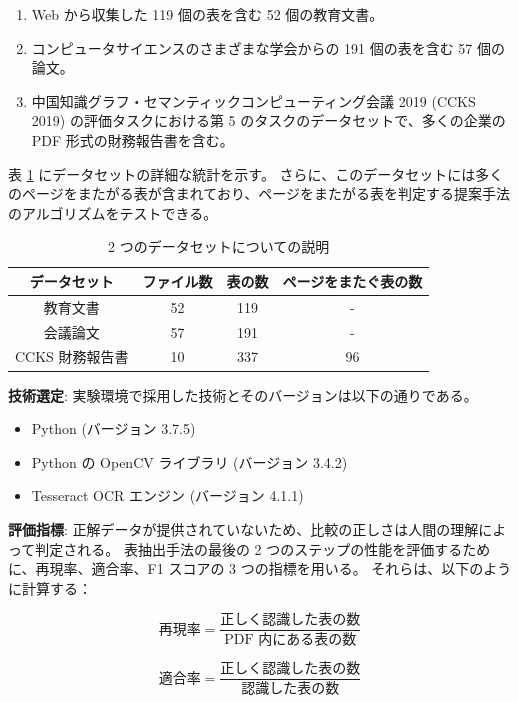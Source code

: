 \documentclass[uplatex, twocolumn,10pt]{jsarticle}
\begin{document}
\begin{enumerate}
    \item Web から収集した 119 個の表を含む 52 個の教育文書。
    \item コンピュータサイエンスのさまざまな学会からの 191 個の表を含む 57 個の論文。
    \item 中国知識グラフ・セマンティックコンピューティング会議 2019 (CCKS 2019) の評価タスクにおける第 5 のタスクのデータセットで、多くの企業の PDF 形式の財務報告書を含む。
\end{enumerate}

表 \ref{table1} にデータセットの詳細な統計を示す。
さらに、このデータセットには多くのページをまたがる表が含まれており、ページをまたがる表を判定する提案手法のアルゴリズムをテストできる。

\begin{table}[tp]
    \centering
    \caption{2 つのデータセットについての説明}
    \label{table1}
    \begin{tabular}{cccc}
        データセット & ファイル数 & 表の数 & ページをまたぐ表の数 \\
        \toprule
        教育文書 & 52 & 119 & - \\
        会議論文 & 57 & 191 & - \\
        CCKS 財務報告書 & 10 & 337 & 96 \\
    \end{tabular}
\end{table}

\textbf{技術選定}:
実験環境で採用した技術とそのバージョンは以下の通りである。
\begin{itemize}
    \item Python (バージョン 3.7.5)
    \item Python の OpenCV ライブラリ (バージョン 3.4.2)
    \item Tesseract OCR エンジン (バージョン 4.1.1)
\end{itemize}

\textbf{評価指標}:
正解データが提供されていないため、比較の正しさは人間の理解によって判定される。
表抽出手法の最後の 2 つのステップの性能を評価するために、再現率、適合率、F1 スコアの 3 つの指標を用いる。
それらは、以下のように計算する：

\begin{equation}
    \text{再現率} = \frac{\text{正しく認識した表の数}}{\text{PDF 内にある表の数}}
\end{equation}

\begin{equation}
    \text{適合率} = \frac{\text{正しく認識した表の数}}{\text{認識した表の数}}
\end{equation}
\end{document}
